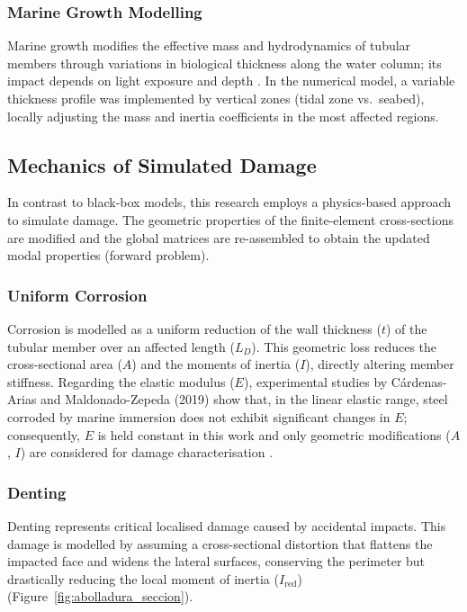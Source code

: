 \documentclass[preprint,12pt]{elsarticle}
\begin{document}
\subsubsection{Marine Growth Modelling}

Marine growth modifies the effective mass and hydrodynamics of tubular members through variations in biological thickness along the water column; its impact depends on light exposure and depth \citep{birci2020integrity,salama2020shm}. In the numerical model, a variable thickness profile was implemented by vertical zones (tidal zone vs.\ seabed), locally adjusting the mass and inertia coefficients in the most affected regions.

\FloatBarrier
\subsection{Mechanics of Simulated Damage}

In contrast to black-box models, this research employs a physics-based approach to simulate damage. The geometric properties of the finite-element cross-sections are modified and the global matrices are re-assembled to obtain the updated modal properties (forward problem).

\subsubsection{Uniform Corrosion}
Corrosion is modelled as a uniform reduction of the wall thickness ($t$) of the tubular member over an affected length ($L_D$). This geometric loss reduces the cross-sectional area ($A$) and the moments of inertia ($I$), directly altering member stiffness. Regarding the elastic modulus ($E$), experimental studies by C\'{a}rdenas-Arias and Maldonado-Zepeda (2019) show that, in the linear elastic range, steel corroded by marine immersion does not exhibit significant changes in $E$; consequently, $E$ is held constant in this work and only geometric modifications ($A$, $I$) are considered for damage characterisation \citep{CardenasArias2019_article}.

\subsubsection{Denting}
Denting represents critical localised damage caused by accidental impacts. This damage is modelled by assuming a cross-sectional distortion that flattens the impacted face and widens the lateral surfaces, conserving the perimeter but drastically reducing the local moment of inertia ($I_{\text{red}}$) (Figure~\ref{fig:abolladura_seccion}).
\end{document}
